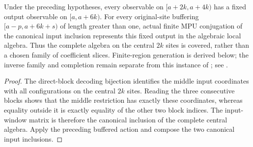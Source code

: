 \begin{lemma}
    \label{thm:mpu_finite_heisenberg_full_central_interval}
    \leanok
    Under the preceding hypotheses, every observable on
    $\lbrack a+2k,a+4k)$ has a fixed output observable on
    $\lbrack a,a+6k)$.
    For every original-site buffering $\lbrack a-p,a+6k+s)$ of length
    greater than one, actual finite MPU conjugation of the canonical
    input inclusion represents this fixed output in the algebraic
    local algebra. Thus the complete algebra on the central $2k$
    sites is covered, rather than a chosen family of coefficient
    slices. Finite-region generation is derived below; the inverse
    family and completion remain separate from this instance of
    \cite[lines~2300--2306]{Cirac2017MPU}; see
    \cite{gap:mpu_qca_complete_block_heisenberg_scope}.
\end{lemma}
\begin{proof}\leanok
    The direct-block decoding bijection identifies the middle input
    coordinates with all configurations on the central $2k$ sites.
    Reading the three consecutive blocks shows that the middle
    restriction has exactly these coordinates, whereas equality
    outside it is exactly equality of the other two block indices.
    The input-window matrix is therefore the canonical inclusion of
    the complete central algebra. Apply the preceding buffered action
    and compose the two canonical input inclusions.
\end{proof}


